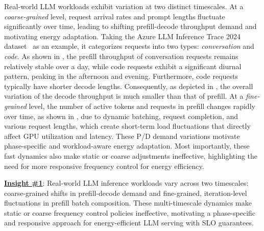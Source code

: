 


Real-world LLM workloads exhibit variation at two distinct timescales.
At a \emph{coarse-grained} level, request arrival rates and prompt lengths fluctuate significantly over time, leading to shifting prefill-decode throughput demand and motivating energy adaptation.
Taking the Azure LLM Inference Trace 2024 dataset~\cite{stojkovic2025dynamollm} as an example, it categorizes requests into two types: \emph{conversation} and \emph{code}.
As shown in , the prefill throughput of conversation requests remains relatively stable over a day, while code requests exhibit a significant diurnal pattern, peaking in the afternoon and evening.
Furthermore, code requests typically have shorter decode lengths.
Consequently, as depicted in , the overall variation of the decode throughput is much smaller than that of prefill.
At a \emph{fine-grained} level, the number of active tokens and requests in prefill changes rapidly over time, as shown in , due to dynamic batching, request completion, and various request lengths, which create short-term load fluctuations that directly affect GPU utilization and latency.
These P/D demand variations motivate phase-specific and workload-aware energy adaptation.
Most importantly, these fast dynamics also make static or coarse adjustments ineffective, highlighting the need for more responsive frequency control for energy efficiency. 



\textbf{\underline{Insight \#1}}:
Real-world LLM inference workloads vary across two timescales: coarse-grained shifts in prefill-decode demand and fine-grained, iteration-level fluctuations in prefill batch composition.
These multi-timescale dynamics make static or coarse frequency control policies ineffective, motivating a phase-specific and responsive approach for energy-efficient LLM serving with SLO guarantees. 



